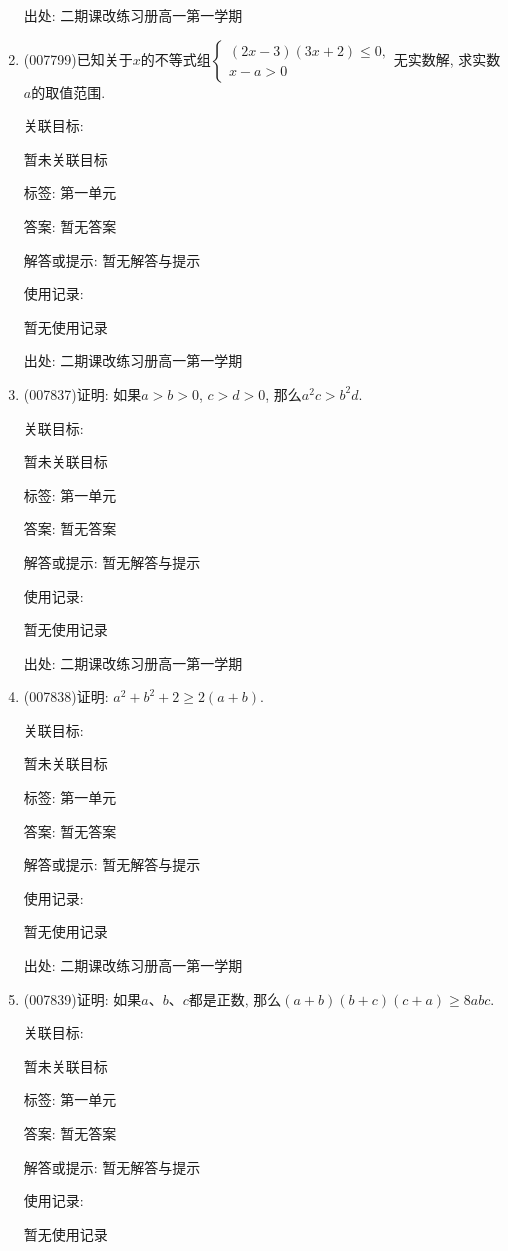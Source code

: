\documentclass[10pt,a4paper]{article}
\begin{document}
\begin{enumerate}[1.]
出处: 二期课改练习册高一第一学期
\item { (007799)}已知关于$x$的不等式组$\begin{cases} (2x-3)(3x+2)\le 0, \\ x-a>0 \end{cases}$无实数解, 求实数$a$的取值范围.


关联目标:

暂未关联目标



标签: 第一单元

答案: 暂无答案

解答或提示: 暂无解答与提示

使用记录:

暂无使用记录


出处: 二期课改练习册高一第一学期
\item { (007837)}证明: 如果$a>b>0$, $c>d>0$, 那么$a^2c>b^2d$.


关联目标:

暂未关联目标



标签: 第一单元

答案: 暂无答案

解答或提示: 暂无解答与提示

使用记录:

暂无使用记录


出处: 二期课改练习册高一第一学期
\item { (007838)}证明: $a^2+b^2+2\ge 2(a+b)$.


关联目标:

暂未关联目标



标签: 第一单元

答案: 暂无答案

解答或提示: 暂无解答与提示

使用记录:

暂无使用记录


出处: 二期课改练习册高一第一学期
\item { (007839)}证明: 如果$a$、$b$、$c$都是正数, 那么$(a+b)(b+c)(c+a)\ge 8abc$.


关联目标:

暂未关联目标



标签: 第一单元

答案: 暂无答案

解答或提示: 暂无解答与提示

使用记录:

暂无使用记录



\end{enumerate}
\end{document}
